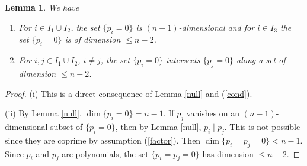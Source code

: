 \documentclass[pdflatex,sn-mathphys-num]{sn-jnl}%
\theoremstyle{thmstyleone}%
\newtheorem{lemma}[theorem]{Lemma}
\theoremstyle{thmstyletwo}%
\theoremstyle{thmstylethree}%
\begin{document}
\begin{lemma}\label{reg}
	We have
	\begin{enumerate}
		\item[(i)]  For $i\in I_1\cup I_2 $, the set $\{p_i=0\}$ is $(n-1)$-dimensional and for $i\in I_3 $ the set $\{p_i=0\}$ is of dimension $\le n-2$.
		
		\item[(ii)]  For $ i,j\in I_1\cup I_2$, $i\neq j$, the set $\{p_i=0\}$ intersects $\{p_j=0\}$ along a set of dimension $\le n-2$.
	\end{enumerate}
\end{lemma}
\begin{proof}
	
	(i) This is a direct consequence of Lemma \ref{null} and (\ref{cond}).
	
	(ii) By Lemma \ref{null}, $\dim \{p_{i}=0\}= n-1$. If $p_{j}$ vanishes on an $(n-1)$-dimensional subset of $\{p_{i}=0\}$, then by Lemma \ref{null}, $p_{i}\mid p_{j}$. This is not possible since they are coprime by assumption (\ref{factor}). Then $\dim \{p_{i}=p_{j}=0\}< n-1$. Since $p_i$ and $p_j$ are polynomials, the set $\{p_{i}=p_{j}=0\}$ has dimension $\le n-2$.
\end{proof}
\end{document}
